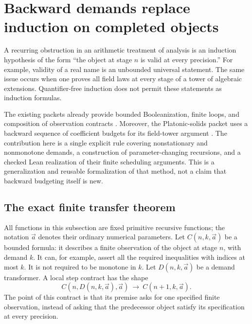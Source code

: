\section{Backward demands replace induction on completed objects}
\label{sec:backward-demands}

A recurring obstruction in an arithmetic treatment of analysis is an
induction hypothesis of the form ``the object at stage $n$ is valid at every
precision.''  For example, validity of a real name is an unbounded universal
statement.  The same issue occurs when one proves all field laws at every
stage of a tower of algebraic extensions.  Quantifier-free induction does
not permit these statements as induction formulas.

The existing packets already provide bounded Booleanization, finite loops,
and composition of observation contracts
\cite{repo-contracts,repo-embedding}.  Moreover, the Platonic-solids packet
uses a backward sequence of coefficient budgets for its field-tower
argument \cite{repo-platonic}.  The contribution here is a single explicit
rule covering nonstationary and nonmonotone demands, a construction of
parameter-changing recursions, and a checked Lean realization of their
finite scheduling arguments.  This is a generalization and reusable
formalization of that method, not a claim that backward budgeting itself
is new.

\subsection{The exact finite transfer theorem}

All functions in this subsection are fixed primitive recursive functions;
the notation $\vec a$ denotes their ordinary numerical parameters.  Let
$C(n,k,\vec a)$ be a bounded formula: it describes a finite observation of
the object at stage $n$, with demand $k$.  It can, for example, assert all
the required inequalities with indices at most $k$.  It is not required
to be monotone in $k$.  Let $D(n,k,\vec a)$ be a demand transformer.  A local
step contract has the shape
\begin{equation}\label{eq:backward-local-step}
 C(n,D(n,k,\vec a),\vec a)
       \ \longrightarrow\ C(n+1,k,\vec a).
\end{equation}
The point of this contract is that its premise asks for one specified
finite observation, instead of asking that the predecessor object satisfy
its specification at every precision.

